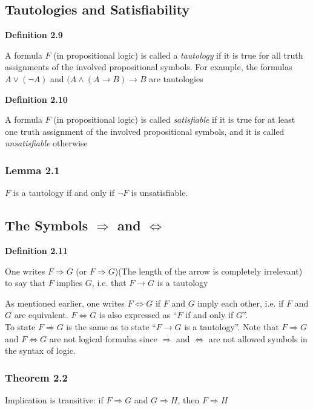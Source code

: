 \documentclass[a4paper]{report}
\newenvironment{definition}[1]{\begin{framed}\centerline{\textbf{Definition #1}}\noindent\hspace{-1.1mm}}{\end{framed}}
\begin{document}
\subsection{Tautologies and Satisfiability}
\begin{definition}{2.9}
A formula $F$ (in propositional logic) is called a \emph{tautology} if it is true for all truth assignments of the involved propositional symbols. For example, the formulas $A\lor(\lnot A)$ and $(A\land (A\to B)\to B$ are tautologies
\end{definition}

\begin{definition}{2.10}
A formula $F$ (in propositional logic) is called \emph{satisfiable} if it is true for at least one truth assignment of the involved propositional symbols, and it is called \emph{unsatisfiable} otherwise
\end{definition}


\subsubsection*{Lemma 2.1}
{$F$ is a tautology if and only if $\lnot F$ is unsatisfiable.}
\subsection{The Symbols $\Longrightarrow$ and $\Longleftrightarrow$}
\begin{definition}{2.11}
One writes $F\Longrightarrow G$ (or $F\Rightarrow G$)(The length of the arrow is completely irrelevant) to say that $F$ implies $G$, i.e. that $F\to G$ is a tautology
\end{definition}
As mentioned earlier, one writes $F\Longleftrightarrow G$ if $F$ and $G$ imply each other, i.e. if $F$ and $G$ are equivalent. $F\Longleftrightarrow G$ is also expressed as ``$F$ if and only if $G$''.\\

To state $F\Longrightarrow G$ is the same as to state ``$F\to G$ is a tautology''. Note that $F\Longrightarrow G$ and $F\Longleftrightarrow G$ are not logical formulas since $\Longrightarrow$ and $\Longleftrightarrow$ are not allowed symbols in the syntax of logic. 
\subsubsection*{Theorem 2.2}
Implication is transitive: if $F\Longrightarrow G$ and $G\Longrightarrow H$, then $F\Longrightarrow H$\\
\end{document}
